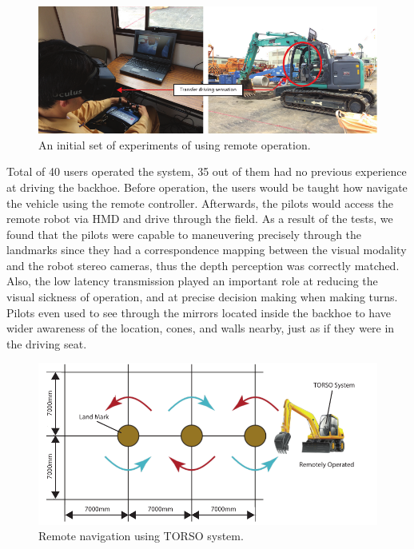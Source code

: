 \begin{figure}[htpb]
  \centering
	  \includegraphics[width=1\linewidth]{figures/eval/NEDO/Expermint1.pdf}
  \captionsetup{justification=centering}
  \caption{An initial set of experiments of using remote operation.}
  \label{fig:usability-nedo-exp1}
\end{figure}

Total of 40 users operated the system, 35 out of them had no previous experience at driving the backhoe. Before operation, the users would be taught how navigate the vehicle using the remote controller. Afterwards, the pilots would access the remote robot via HMD and drive through the field. As a result of the tests, we found that the pilots were capable to maneuvering precisely through the landmarks since they had a correspondence mapping between the visual modality and the robot stereo cameras, thus the depth perception was correctly matched. Also, the low latency transmission played an important role at reducing the visual sickness of operation, and at precise decision making when making turns. Pilots even used to see through the mirrors located inside the backhoe to have wider awareness of the location, cones, and walls nearby, just as if they were in the driving seat. 

\begin{figure}[htpb]
  \centering
	  \includegraphics[width=1\linewidth]{figures/eval/NEDO/experiment.pdf}
  \captionsetup{justification=centering}
  \caption{Remote navigation using TORSO system.}
  \label{fig:usability-nedo-exp-setup}
\end{figure}

